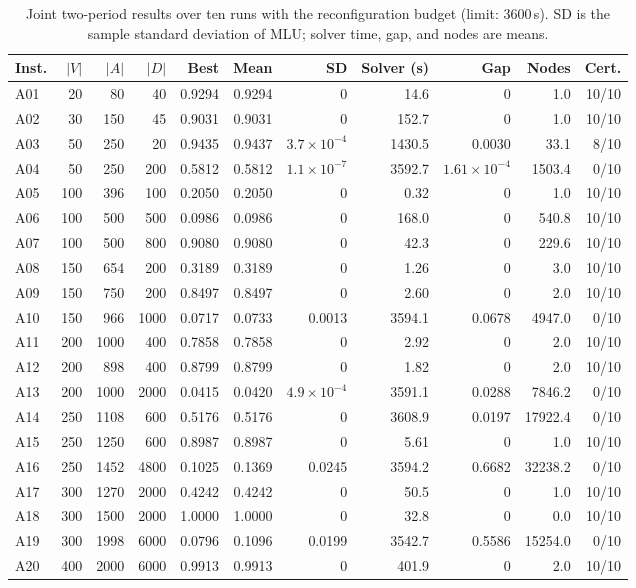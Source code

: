 \begin{table}[h!]
\centering
\caption{Joint two-period results over ten runs with the reconfiguration budget (limit: 3600\,s). SD
is the sample standard deviation of MLU; solver time, gap, and nodes are means.}
\label{tab:full}
\renewcommand{\arraystretch}{1.1}
\footnotesize
\setlength{\tabcolsep}{4pt}
\begin{tabular}{@{}lrrrrrrrrrr@{}}
\toprule
\textbf{Inst.} & \textbf{$|V|$} & \textbf{$|A|$} & \textbf{$|D|$} & \textbf{Best} & \textbf{Mean} &
\textbf{SD} & \textbf{Solver (s)} & \textbf{Gap} & \textbf{Nodes} & \textbf{Cert.} \\
\midrule
A01 & 20 & 80 & 40 & 0.9294 & 0.9294 & 0 & 14.6 & 0 & 1.0 & 10/10 \\
A02 & 30 & 150 & 45 & 0.9031 & 0.9031 & 0 & 152.7 & 0 & 1.0 & 10/10 \\
A03 & 50 & 250 & 20 & 0.9435 & 0.9437 & $3.7\times10^{-4}$ & 1430.5 & 0.0030 & 33.1 & 8/10 \\
A04 & 50 & 250 & 200 & 0.5812 & 0.5812 & $1.1\times10^{-7}$ & 3592.7 & $1.61\times10^{-4}$ & 1503.4 & 0/10 \\
A05 & 100 & 396 & 100 & 0.2050 & 0.2050 & 0 & 0.32 & 0 & 1.0 & 10/10 \\
A06 & 100 & 500 & 500 & 0.0986 & 0.0986 & 0 & 168.0 & 0 & 540.8 & 10/10 \\
A07 & 100 & 500 & 800 & 0.9080 & 0.9080 & 0 & 42.3 & 0 & 229.6 & 10/10 \\
A08 & 150 & 654 & 200 & 0.3189 & 0.3189 & 0 & 1.26 & 0 & 3.0 & 10/10 \\
A09 & 150 & 750 & 200 & 0.8497 & 0.8497 & 0 & 2.60 & 0 & 2.0 & 10/10 \\
A10 & 150 & 966 & 1000 & 0.0717 & 0.0733 & 0.0013 & 3594.1 & 0.0678 & 4947.0 & 0/10 \\
A11 & 200 & 1000 & 400 & 0.7858 & 0.7858 & 0 & 2.92 & 0 & 2.0 & 10/10 \\
A12 & 200 & 898 & 400 & 0.8799 & 0.8799 & 0 & 1.82 & 0 & 2.0 & 10/10 \\
A13 & 200 & 1000 & 2000 & 0.0415 & 0.0420 & $4.9\times10^{-4}$ & 3591.1 & 0.0288 & 7846.2 & 0/10 \\
A14 & 250 & 1108 & 600 & 0.5176 & 0.5176 & 0 & 3608.9 & 0.0197 & 17922.4 & 0/10 \\
A15 & 250 & 1250 & 600 & 0.8987 & 0.8987 & 0 & 5.61 & 0 & 1.0 & 10/10 \\
A16 & 250 & 1452 & 4800 & 0.1025 & 0.1369 & 0.0245 & 3594.2 & 0.6682 & 32238.2 & 0/10 \\
A17 & 300 & 1270 & 2000 & 0.4242 & 0.4242 & 0 & 50.5 & 0 & 1.0 & 10/10 \\
A18 & 300 & 1500 & 2000 & 1.0000 & 1.0000 & 0 & 32.8 & 0 & 0.0 & 10/10 \\
A19 & 300 & 1998 & 6000 & 0.0796 & 0.1096 & 0.0199 & 3542.7 & 0.5586 & 15254.0 & 0/10 \\
A20 & 400 & 2000 & 6000 & 0.9913 & 0.9913 & 0 & 401.9 & 0 & 2.0 & 10/10 \\
\bottomrule
\end{tabular}
\end{table}

